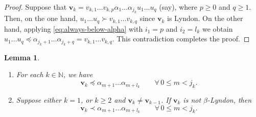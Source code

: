 \documentclass[11pt]{amsart}
\newtheorem{lemma}[theorem]{Lemma}
\theoremstyle{definition}
\theoremstyle{remark}
\numberwithin{equation}{section}
\newcommand{\N}{\ensuremath{\mathbb{N}}}
\renewcommand{\v}{\mathbf{v}}
\newcommand{\al}{\alpha}
\newcommand{\lle}{\preccurlyeq}
\begin{document}
\begin{proof}
Suppose that $\v_k=v_{k,1}\dots v_{k,p}\al_1\dots\al_{j_k}u_1\dots u_q$ (say), where $p\geq 0$ and $q\geq 1$. Then, on the one hand, $u_1\dots u_q\succ v_{k,1}\dots v_{k,q}$ since $\v_k$ is Lyndon. On the other hand, applying \eqref{eq:always-below-alpha} with $i_1=p$ and $i_2=l_k$ we obtain $u_1\dots u_q\lle \al_{j_k+1}\dots\al_{j_k+q}=v_{k,1}\dots v_{k,q}$. This contradiction completes the proof. 
\end{proof}

\begin{lemma} \label{lem:v_k-upper-bound}
\begin{enumerate}[{\rm(i)}]
\item For each $k\in\N$, we have
\begin{equation} \label{eq:v_k-upper-bound}
\v_k\lle\al_{m+1}\dots \al_{m+l_k} \qquad\forall\, 0\leq m<j_k.
\end{equation}
\item Suppose either $k=1$, or $k\geq 2$ and $\v_k\neq \v_{k-1}$. If $\v_k$ is not $\beta$-Lyndon, then
\begin{equation} \label{eq:strict-v_k-upper-bound}
\v_k\prec\al_{m+1}\dots \al_{m+l_k} \qquad\forall\, 0\leq m<j_k.
\end{equation}
\end{enumerate}
\end{lemma}
\end{document}
